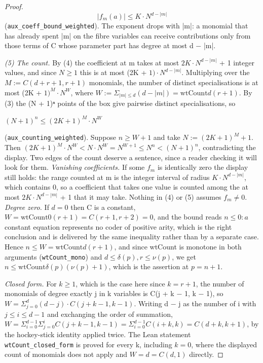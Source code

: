 \documentclass[11pt]{article}
\theoremstyle{plain}
\theoremstyle{definition}
\theoremstyle{remark}
\theoremstyle{plain}
\theoremstyle{definition}
\theoremstyle{remark}
\theoremstyle{plain}
\theoremstyle{definition}
\theoremstyle{remark}
\begin{document}
\begin{proof}
\[
|f_{m}(a)| ≤ K · N^{d − |m|}
\]
(\texttt{aux\_\allowbreak{}coeff\_\allowbreak{}bound\_\allowbreak{}weighted}). The exponent drops with |m|: a monomial that has already spent |m| on the fibre variables can receive contributions only from those terms of C whose parameter part has degree at most d − |m|.

\emph{(5) The count.} By (4) the coefficient at m takes at most $2K·N^{d−|m|}$ + 1 integer values, and since $N ≥ 1$ this is at most (2K + $1)·N^{d−|m|}$. Multiplying over the $M := C(d + r + 1, r + 1)$ monomials, the number of distinct specialisations is at most (2K + $1)^{M} · N^{W}$, where $W := Σ_{|m| ≤ d} (d − |m|) = \mathrm{wtCount} d (r + 1)$. By (3) the (N + 1)ⁿ points of the box give pairwise distinct specialisations, so

$(N + 1)^{n} ≤ (2K + 1)^{M} · N^{W}$

(\texttt{aux\_\allowbreak{}counting\_\allowbreak{}weighted}). Suppose $n ≥ W + 1$ and take $N := (2K + 1)^{M} + 1$. Then $(2K + 1)^{M} · N^{W} < N · N^{W} = N^{W+1} ≤ N^{n} < (N + 1)^{n}$, contradicting the display. Two edges of the count deserve a sentence, since a reader checking it will look for them. \emph{Vanishing coefficients.} If some $f_{m}$ is identically zero the display still holds: the range counted at m is the integer interval of radius $K·N^{d−|m|}$, which contains 0, so a coefficient that takes one value is counted among the at most $2K·N^{d−|m|}$ + 1 that it may take. Nothing in (4) or (5) assumes $f_{m} ≠ 0$. \emph{Degree zero.} If $d = 0$ then C is a constant, $W = \mathrm{wtCount} 0 (r + 1) = C(r + 1, r + 2) = 0$, and the bound reads $n ≤ 0: a$ constant equation represents no coder of positive arity, which is the right conclusion and is delivered by the same inequality rather than by a separate case. Hence $n ≤ W = \mathrm{wtCount} d (r + 1)$, and since wtCount is monotone in both arguments (\texttt{wtCount\_\allowbreak{}mono}) and $d ≤ δ(p), r ≤ ν(p)$, we get $n ≤ \mathrm{wtCount} δ(p) (ν(p) + 1)$, which is the assertion at $p = n + 1$.

\emph{Closed form.} For $k ≥ 1$, which is the case here since $k = r + 1$, the number of monomials of degree exactly j in k variables is C(j + k − 1, k − 1), so $W = Σ_{j=0}^{d} (d − j)·C(j + k − 1, k − 1)$. Writing d − j as the number of i with $j ≤ i ≤ d − 1$ and exchanging the order of summation, $W = Σ_{i=0}^{d−1} Σ_{j=0}^{i} C(j + k − 1, k − 1) = Σ_{i=0}^{d−1} C(i + k, k) = C(d + k, k + 1)$, by the hockey-stick identity applied twice. The Lean statement \texttt{wtCount\_\allowbreak{}closed\_\allowbreak{}form} is proved for every k, including $k = 0$, where the displayed count of monomials does not apply and $W = d = C(d, 1)$ directly.

\end{proof}
\end{document}
